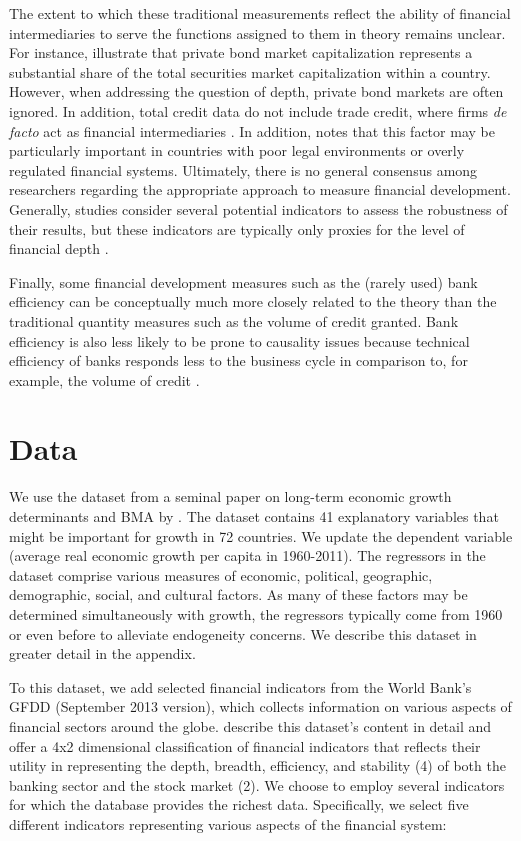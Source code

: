 \begin{refsection}
The extent to which these traditional measurements reflect the ability of financial intermediaries to serve the functions assigned to them in theory remains unclear. For instance, \textcite{Cihaketal2013} illustrate that private bond market capitalization represents a substantial share of the total securities market capitalization within a country. However, when addressing the question of depth, private bond markets are often ignored. In addition, total credit data do not include trade credit, where firms \textit{de facto} act as financial intermediaries \parencite{PetersenRajan1997}. In addition, \textcite{Levine2005} notes that this factor may be particularly important in countries with poor legal environments or overly regulated financial systems. Ultimately, there is no general consensus among researchers regarding the appropriate approach to measure financial development. Generally, studies consider several potential indicators to assess the robustness of their results, but these indicators are typically only proxies for the level of financial depth \parencite{Valickovaetal2014}.

Finally, some financial development measures such as the (rarely used) bank efficiency can be conceptually much more closely related to the theory \parencite{Pagano1993} than the traditional quantity measures such as the volume of credit granted. Bank efficiency is also less likely to be prone to causality issues because technical efficiency of banks responds less to the business cycle in comparison to, for example, the volume of credit \parencite{KoetterWedow2010}.

\section{Data}
\label{ch2sec:data}
We use the dataset from a seminal paper on long-term economic growth determinants and \ac{BMA} by \textcite{Fernandezetal2001}. The dataset contains 41 explanatory variables that might be important for growth in 72 countries. We update the dependent variable (average real economic growth per capita in 1960-2011). The regressors in the dataset comprise various measures of economic, political, geographic, demographic, social, and cultural factors. As many of these factors may be determined simultaneously with growth, the regressors typically come from 1960 or even before to alleviate endogeneity concerns. We describe this dataset in greater detail in the appendix.

To this dataset, we add selected financial indicators from the World Bank's \ac{GFDD} (September 2013 version), which collects information on various aspects of financial sectors around the globe. \textcite{Cihaketal2013} describe this dataset's content in detail and offer a 4x2 dimensional classification of financial indicators that reflects their utility in representing the depth, breadth, efficiency, and stability (4) of both the banking sector and the stock market (2). We choose to employ several indicators for which the database provides the richest data. Specifically, we select five different indicators representing various aspects of the financial system:


\end{refsection}
